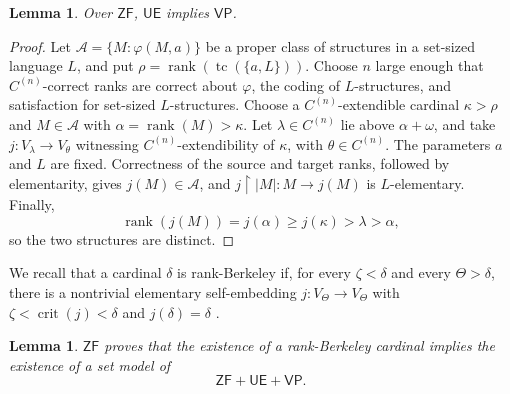 \documentclass[11pt,a4paper]{amsart}
\newcommand{\VP}{\mathsf{VP}}
\newcommand{\ZF}{\mathsf{ZF}}
\newcommand{\tc}{\operatorname{tc}}
\newcommand{\rank}{\operatorname{rank}}
\newcommand{\restr}{\mathbin{\upharpoonright}}
\newcommand{\crit}{\operatorname{crit}}
\newcommand{\UE}{\mathsf{UE}}
\theoremstyle{plain}
\newtheorem{lemma}[theorem]{Lemma}
\theoremstyle{definition}
\theoremstyle{remark}
\begin{document}
\begin{lemma}\label{lem:OH-VP}
Over $\ZF$, $\UE$ implies $\VP$.
\end{lemma}

\begin{proof}
 Let $\mathcal A=\{M:\varphi(M,a)\}$ be a proper class of structures in a set-sized language $L$, and put $\rho=\rank(\tc(\{a,L\}))$.  Choose $n$ large enough that $C^{(n)}$-correct ranks are correct about $\varphi$, the coding of $L$-structures, and satisfaction for set-sized $L$-structures.  Choose a $C^{(n)}$-extendible cardinal $\kappa>\rho$ and $M\in\mathcal A$ with $\alpha=\rank(M)>\kappa$.  Let $\lambda\in C^{(n)}$ lie above $\alpha+\omega$, and take $j:V_\lambda\longrightarrow V_\theta$ witnessing $C^{(n)}$-extendibility of $\kappa$, with $\theta\in C^{(n)}$.  The parameters $a$ and $L$ are fixed.  Correctness of the source and target ranks, followed by elementarity, gives $j(M)\in\mathcal A$, and $j\restr|M|:M\to j(M)$ is $L$-elementary.  Finally,
\[
\rank(j(M))=j(\alpha)\geq j(\kappa)>\lambda>\alpha,
\]
so the two structures are distinct.
\end{proof}

We recall that a cardinal $\delta$ is rank-Berkeley if, for every $\zeta<\delta$ and every $\Theta>\delta$, there is a nontrivial elementary self-embedding $j:V_\Theta\to V_\Theta$ with $\zeta<\crit(j)<\delta$ and $j(\delta)=\delta$ \cite[Definition~4.4]{Mohammd}.

\begin{lemma}\label{lem:rank-Berkeley-descent}
$\ZF$ proves that the existence of a rank-Berkeley cardinal implies the existence of a set model of
\[
\ZF+\UE+\VP.
\]
\end{lemma}
\end{document}
